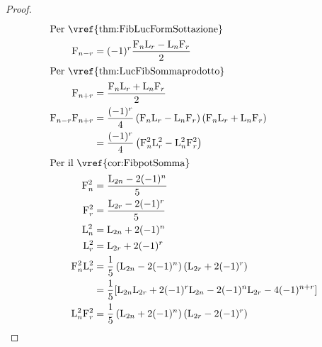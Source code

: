 \begin{proof}
	\begin{align*}
		\intertext{Per~\vref{thm:FibLucFormSottazione}}
		\Fib{n-r}={}                                                           & (-1)^r\dfrac{\Fib{n}\Luc{r}-\Luc{n}\Fib{r}}{2}                                                        \\
		\intertext{Per~\vref{thm:LucFibSommaprodotto}}
		\Fib{n+r}={}                                                           & \dfrac{\Fib{n}\Luc{r}+\Luc{n}\Fib{r}}{2}                                                              \\
		\Fib{n-r}\Fib{n+r}
		={}                                                                    & \dfrac{(-1)^r}{4}\left(\Fib{n}\Luc{r}-\Luc{n}\Fib{r}\right)\left(\Fib{n}\Luc{r}+\Luc{n}\Fib{r}\right) \\
		={}                                                                    & \dfrac{(-1)^r}{4}\left(\Fib{n}^2\Luc{r}^2-\Luc{n}^2\Fib{r}^2\right)                                   \\
		\intertext{Per il~\vref{cor:FibpotSomma}}
		\Fib{n}^2={}                                                           & \dfrac{\Luc{2n}-2(-1)^n}{5}                                                                           \\
		\Fib{r}^2={}                                                           & \dfrac{\Luc{2r}-2(-1)^r}{5}                                                                           \\
		\Luc{n}^2={}                                                           & \Luc{2n}+2(-1)^n                                                                                      \\
		\Luc{r}^2={}                                                           & \Luc{2r}+2(-1)^r                                                                                      \\
		\Fib{n}^2\Luc{r}^2={}                                                  & \dfrac{1}{5}\left(\Luc{2n}-2(-1)^n\right)\left(\Luc{2r}+2(-1)^r\right)                                \\
		={}                                                                    & \dfrac{1}{5}[\Luc{2n}\Luc{2r}+2(-1)^r\Luc{2n}-2(-1)^n\Luc{2r}-4(-1)^{n+r}]                            \\
		\Luc{n}^2\Fib{r}^2={}                                                  & \dfrac{1}{5}\left(\Luc{2n}+2(-1)^n\right)\left(\Luc{2r}-2(-1)^r
		\right)                                                                                                                                                                        \\

\end{align*}
\end{proof}
